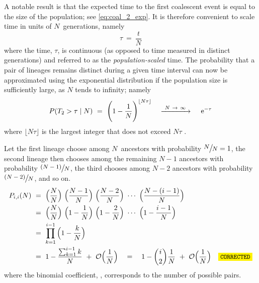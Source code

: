 A notable result is that the expected time to the first coalescent event is equal to the size of the population; see \cref{eq:coal_2_exp}.
It is therefore convenient to scale time in units of $N$~generations, namely
\begin{equation}\label{eq:timescale}
	\tau ~=~ \frac{t}{N}
\end{equation}
where the time, $\tau$, is continuous (as opposed to time measured in distinct generations) and referred to as the \emph{population-scaled} time.
The probability that a pair of lineages remains distinct during a given time interval can now be approximated using the exponential distribution if the population size is sufficiently large, \ie as $N$ tends to infinity; namely
\begin{equation}\label{eq:coal_2_dont}
	P(T_2 > \tau \mid N)
	~=~ \Bigg( 1 - \frac{1}{N} \Bigg)^{\lfloor N \tau \rfloor}
	\quad \xrightarrow{~ N~\rightarrow~\infty ~} \quad
	\,\mathrm{e}^{-\tau}
\end{equation}
where ${\lfloor N \tau \rfloor}$ is the largest integer that does not exceed ${N \tau}$ \citep[\eg, see][]{nordborg2001coalescent}.


Let the first lineage choose among $N$~ancestors with probability ${\large \sfrac{N}{N} = 1}$, the second lineage then chooses among the remaining ${N-1}$ ancestors with probability ${\large \sfrac{(N-1)}{N}}$, the third chooses among ${N-2}$ ancestors with probability ${\large \sfrac{(N-2)}{N}}$, and so on.
\begin{equation}\label{eq:coal_n_dont}
\begin{split}
  P_{i,i}(N)
  & ~=~ \Big(\frac{N}{N}\Big) ~ \Big(\frac{N-1}{N}\Big) ~ \Big(\frac{N-2}{N}\Big) ~ \cdots ~ \Big(\frac{N-(i-1)}{N}\Big) \\
  & ~=~ \Big(\frac{N}{N}\Big) ~ \Big(1-\frac{1}{N}\Big) ~ \Big(1-\frac{2}{N}\Big) ~ \cdots ~ \Big(1-\frac{i-1}{N}\Big) \\
	& ~=~ \prod_{k=1}^{i-1} \Big( 1 - \frac{k}{N} \Big) \\
  & ~=~ 1-\frac{{\sum_{k=1}^{i-1}k}}{N} ~+~ \mathcal{O}\Big( \frac{1}{N} \Big)
	\quad = \quad 1 - {i \choose 2} \frac{1}{N} ~+~ \mathcal{O}\Big( \frac{1}{N} \Big) \CorrectLabel
\end{split}
\end{equation}
where the binomial coefficient, , corresponds to the number of possible pairs.

